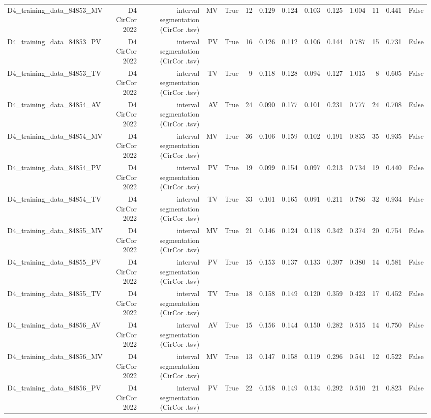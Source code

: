 \begin{table}[htbp]
\begin{tabular}{lrrrrrrrrrrrrr}
    D4\_training\_data\_84853\_MV & D4 CirCor 2022 & interval segmentation (CirCor .tsv) & MV & True & 12 & 0.129 & 0.124 & 0.103 & 0.125 & 1.004 & 11 & 0.441 & False \\
    D4\_training\_data\_84853\_PV & D4 CirCor 2022 & interval segmentation (CirCor .tsv) & PV & True & 16 & 0.126 & 0.112 & 0.106 & 0.144 & 0.787 & 15 & 0.731 & False \\
    D4\_training\_data\_84853\_TV & D4 CirCor 2022 & interval segmentation (CirCor .tsv) & TV & True & 9 & 0.118 & 0.128 & 0.094 & 0.127 & 1.015 & 8 & 0.605 & False \\
    D4\_training\_data\_84854\_AV & D4 CirCor 2022 & interval segmentation (CirCor .tsv) & AV & True & 24 & 0.090 & 0.177 & 0.101 & 0.231 & 0.777 & 24 & 0.708 & False \\
    D4\_training\_data\_84854\_MV & D4 CirCor 2022 & interval segmentation (CirCor .tsv) & MV & True & 36 & 0.106 & 0.159 & 0.102 & 0.191 & 0.835 & 35 & 0.935 & False \\
    D4\_training\_data\_84854\_PV & D4 CirCor 2022 & interval segmentation (CirCor .tsv) & PV & True & 19 & 0.099 & 0.154 & 0.097 & 0.213 & 0.734 & 19 & 0.440 & False \\
    D4\_training\_data\_84854\_TV & D4 CirCor 2022 & interval segmentation (CirCor .tsv) & TV & True & 33 & 0.101 & 0.165 & 0.091 & 0.211 & 0.786 & 32 & 0.934 & False \\
    D4\_training\_data\_84855\_MV & D4 CirCor 2022 & interval segmentation (CirCor .tsv) & MV & True & 21 & 0.146 & 0.124 & 0.118 & 0.342 & 0.374 & 20 & 0.754 & False \\
    D4\_training\_data\_84855\_PV & D4 CirCor 2022 & interval segmentation (CirCor .tsv) & PV & True & 15 & 0.153 & 0.137 & 0.133 & 0.397 & 0.380 & 14 & 0.581 & False \\
    D4\_training\_data\_84855\_TV & D4 CirCor 2022 & interval segmentation (CirCor .tsv) & TV & True & 18 & 0.158 & 0.149 & 0.120 & 0.359 & 0.423 & 17 & 0.452 & False \\
    D4\_training\_data\_84856\_AV & D4 CirCor 2022 & interval segmentation (CirCor .tsv) & AV & True & 15 & 0.156 & 0.144 & 0.150 & 0.282 & 0.515 & 14 & 0.750 & False \\
    D4\_training\_data\_84856\_MV & D4 CirCor 2022 & interval segmentation (CirCor .tsv) & MV & True & 13 & 0.147 & 0.158 & 0.119 & 0.296 & 0.541 & 12 & 0.522 & False \\
    D4\_training\_data\_84856\_PV & D4 CirCor 2022 & interval segmentation (CirCor .tsv) & PV & True & 22 & 0.158 & 0.149 & 0.134 & 0.292 & 0.510 & 21 & 0.823 & False \\

\end{tabular}
\end{table}

